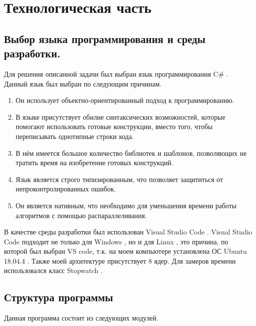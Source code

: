 \chapter{Технологическая часть}

\section{Выбор языка программирования и среды разработки.}

Для решения описанной задачи был выбран язык программирования C\# \cite{Microsoft}.
Данный язык был выбран по следующим причинам.

\begin{enumerate}
	\item Он использует объектно-ориентированный подход к программированию.
	\item В языке присутствует обилие синтаксических возможностей,
	      которые помогают использовать готовые конструкции,
	      вместо того, чтобы переписывать однотипные строки кода.
	\item В нём имеется большое количество библиотек и шаблонов,
	      позволяющих не тратить время на изобретение готовых конструкций.
	\item Язык является строго типизированным,
	      что позволяет защититься от непроконтролированных ошибок.
	\item Он является нативным, что необходимо
	      для уменьшения времени работы алгоритмов с помощью распараллеливания.
\end{enumerate}

В качестве среды разработки был использован Visual Studio Code \cite{Vs}.
Visual Studio Code подходит не только для  Windows \cite{Win},
но и для Linux \cite{Lin}, это причина,
по которой был выбран VS code,
т.к. на моем компьютере установлена ОС Ubuntu 18.04.4 \cite{Ubuntu}.
Также моей архитектуре присутствует 8 ядер.
Для замеров времени использовался класс Stopwatch \cite{Stopwatch}.

\section{Структура программы}

Данная программа состоит из следующих модулей.

